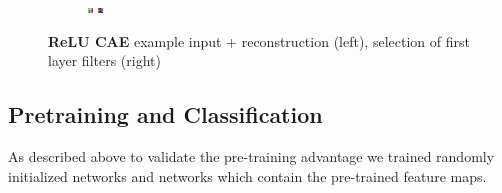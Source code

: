 \documentclass{article}
\begin{document}
\begin{figure}[b]
\begin{subfigure}{0.4\linewidth}
					\includegraphics[width=0.1\linewidth]{../graphics/reconstructions/cifar/relu/relu_filter_07.png} \hspace{0.05\linewidth}
					\includegraphics[width=0.1\linewidth]{../graphics/reconstructions/cifar/relu/relu_filter_08.png} 


				\end{subfigure}

			\caption{\textbf{ReLU CAE} example input + reconstruction (left), selection of first layer filters (right) }
			\label{fig:relu_cae}

    \end{figure}

  \subsection{Pretraining and Classification}


    As described above to validate the pre-training advantage we trained randomly initialized networks and networks which contain the pre-trained feature maps.
\end{document}
